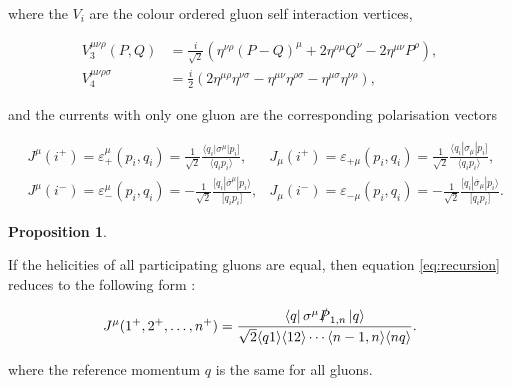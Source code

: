 \documentclass{article}
\theoremstyle{definition}
\newtheorem{prop}[theorem]{Proposition}
\numberwithin{equation}{section}
\begin{document}
where the $V_i$ are the colour ordered gluon self interaction vertices,

\begin{align}
    V_3^{\mu \nu \rho}(P, Q) &= \frac{i}{\sqrt{2}} \left( \eta^{\nu \rho}\left( P - Q \right)^{\mu} + 2 \eta^{\rho \mu} Q^{\nu} - 2 \eta^{\mu \nu} P^{\rho}  \right), \\
    V_4^{\mu \nu \rho \sigma} &= \frac{i}{2} \left( 2 \eta^{\mu \rho} \eta^{\nu \sigma} - \eta^{\mu \nu} \eta^{\rho \sigma} - \eta^{\mu \sigma} \eta^{\nu \rho}  \right),
\end{align}

and the currents with only one gluon are the corresponding polarisation vectors

\begin{subequations}
    \begin{align}
        &J^{\mu}(i^{+}) = \varepsilon_{+}^{\mu}(p_i,q_i) = \frac{1}{\sqrt{2}} \frac{ \langle q_i | \sigma^{\mu} | p_i \rbrack }{ \langle q_i p_i \rangle }, 
        &J_{\mu}(i^{+}) = \varepsilon_{+\mu}(p_i,q_i) = \frac{1}{\sqrt{2}} \frac{ \langle q_i | \sigma_{\mu} | p_i \rbrack }{ \langle q_i p_i \rangle }, \\
        &J^{\mu}(i^{-}) = \varepsilon_{-}^{\mu}(p_i,q_i) = - \frac{1}{\sqrt{2}} \frac{ \lbrack q_i | \overline{\sigma}^{\mu} | p_i \rangle }{ \lbrack q_i p_i \rbrack }, 
        &J_{\mu}(i^{-}) = \varepsilon_{-\mu}(p_i,q_i) = - \frac{1}{\sqrt{2}} \frac{ \lbrack q_i | \overline{\sigma}_{\mu} | p_i \rangle }{ \lbrack q_i p_i \rbrack }.
    \end{align}
\end{subequations}

\begin{prop}
\label{prop:Jppp}

    If the helicities of all participating gluons are equal, then equation \eqref{eq:recursion} reduces to the following form \cite{dixon1996}:

    \begin{align}
        J^{\mu}(1^{+}, 2^{+}, \dots , n^{+}) = \frac{ \bra{q} \sigma^{\mu} \slashed{P}_{1,n} \ket{q} }{ \sqrt{2} \langle q1 \rangle \langle 12 \rangle \cdots \langle n-1,n \rangle \langle nq \rangle } \label{eq:prop1}.
    \end{align}

    where the reference momentum $q$ is the same for all gluons.

\end{prop}
\end{document}
